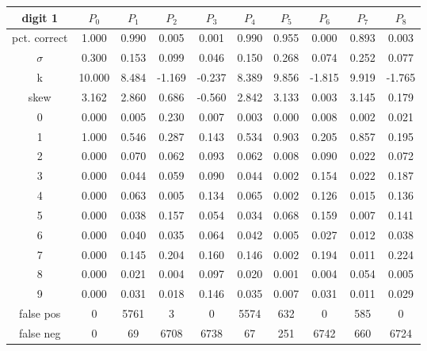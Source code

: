\documentclass{report}
\begin{document}
\newpage


\begin{tabular}{ | c ||  c | c | c | c | c | c | c | c | c |}
 digit 1 & $P_0$ & $P_1$ & $P_2$ & $P_3$ & $P_4$ & $P_5$ & $P_6$ & $P_7$ & $P_8$ \\
\hline \hline
pct. correct  & 1.000 & 0.990 & 0.005 & 0.001 & 0.990 & 0.955 & 0.000 & 0.893 & 0.003 \\
\hline
$\sigma$ & 0.300& 0.153& 0.099& 0.046& 0.150& 0.268& 0.074& 0.252& 0.077 \\
\hline
k & 10.000& 8.484& -1.169& -0.237& 8.389& 9.856& -1.815& 9.919& -1.765 \\
\hline
skew & 3.162& 2.860& 0.686& -0.560& 2.842& 3.133& 0.003& 3.145& 0.179 \\
\hline
0 & 0.000 & 0.005 & 0.230 & 0.007 & 0.003 & 0.000 & 0.008 & 0.002 & 0.021 \\
\hline
1 & 1.000 & 0.546 & 0.287 & 0.143 & 0.534 & 0.903 & 0.205 & 0.857 & 0.195 \\
\hline
2 & 0.000 & 0.070 & 0.062 & 0.093 & 0.062 & 0.008 & 0.090 & 0.022 & 0.072 \\
\hline
3 & 0.000 & 0.044 & 0.059 & 0.090 & 0.044 & 0.002 & 0.154 & 0.022 & 0.187 \\
\hline
4 & 0.000 & 0.063 & 0.005 & 0.134 & 0.065 & 0.002 & 0.126 & 0.015 & 0.136 \\
\hline
5 & 0.000 & 0.038 & 0.157 & 0.054 & 0.034 & 0.068 & 0.159 & 0.007 & 0.141 \\
\hline
6 & 0.000 & 0.040 & 0.035 & 0.064 & 0.042 & 0.005 & 0.027 & 0.012 & 0.038 \\
\hline
7 & 0.000 & 0.145 & 0.204 & 0.160 & 0.146 & 0.002 & 0.194 & 0.011 & 0.224 \\
\hline
8 & 0.000 & 0.021 & 0.004 & 0.097 & 0.020 & 0.001 & 0.004 & 0.054 & 0.005 \\
\hline
9 & 0.000 & 0.031 & 0.018 & 0.146 & 0.035 & 0.007 & 0.031 & 0.011 & 0.029 \\
\hline
false pos  & 0 & 5761 & 3 & 0 & 5574 & 632 & 0 & 585 & 0 \\
\hline
false neg  & 0 & 69 & 6708 & 6738 & 67 & 251 & 6742 & 660 & 6724 \\
\hline
\end{tabular}

\vspace{1cm}
\end{document}
